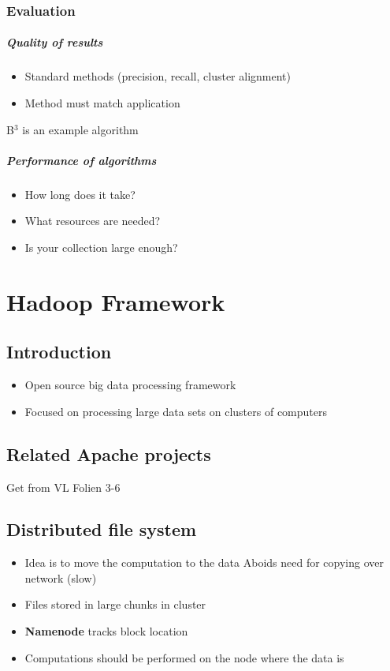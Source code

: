 \documentclass[10pt,a4paper]{scrreprt}
\begin{document}
\subsection{Evaluation}
\paragraph{Quality of results}
\begin{itemize}
	\item Standard methods (precision, recall, cluster alignment)
	\item Method must match application
\end{itemize}
B$^3$ is an example algorithm
\paragraph{Performance of algorithms}
\begin{itemize}
	\item How long does it take?
	\item What resources are needed?
	\item Is your collection large enough?
\end{itemize}


\chapter{Hadoop Framework}
\section{Introduction}
\begin{itemize}
	\item Open source big data processing framework
	\item Focused on processing large data sets on clusters of computers
\end{itemize}

\section{Related Apache projects}
Get from VL Folien 3-6

\section{Distributed file system}
\begin{itemize}
	\item Idea is to move the computation to the data
	\subitem Aboids need for copying over network (slow)
	\item Files stored in large chunks in cluster
	\item \textbf{Namenode} tracks block location
	\item Computations should be performed on the node where the data is
\end{itemize}
\end{document}
